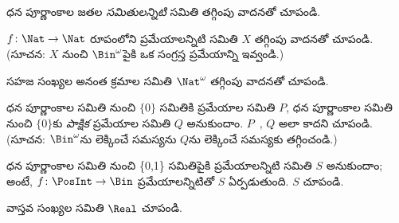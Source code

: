 \documentclass[../../../include/open-logic-section]{subfiles}
\begin{document}
\begin{prob}
ధన పూర్ణాంకాల జతల \emph{సమితులన్నిటి} సమితి 
తగ్గింపు వాదనతో చూపండి.
\end{prob}

\begin{prob}\label{sfr:siz:red:prob:nat-nat}
  $f\colon \Nat \to \Nat$ రూపంలోని ప్రమేయాలన్నిటి సమితి $X$
   తగ్గింపు వాదనతో చూపండి. (సూచన: $X$ నుంచి
  $\Bin^\omega$పైకి ఒక సంగ్రస్త ప్రమేయాన్ని ఇవ్వండి.)
\end{prob}

\begin{prob}
సహజ సంఖ్యల అనంత క్రమాల సమితి $\Nat^\omega$ 
తగ్గింపు వాదనతో చూపండి.
\end{prob}

\begin{prob}
ధన పూర్ణాంకాల సమితి నుంచి $\{0\}$ సమితికి ప్రమేయాల సమితి $P$,
ధన పూర్ణాంకాల సమితి నుంచి $\{0\}$కు \emph{పాక్షిక} ప్రమేయాల సమితి
$Q$ అనుకుందాం. $P$~, $Q$ అలా కాదని చూపండి. (సూచన:
$\Bin^\omega$ను లెక్కించే సమస్యను $Q$ను లెక్కించే సమస్యకు తగ్గించండి.)
\end{prob}

\begin{prob}
ధన పూర్ణాంకాల సమితి నుంచి \{0,1\} సమితిపైకి 
ప్రమేయాలన్నిటి సమితి $S$ అనుకుందాం; అంటే, 
$f\colon \PosInt \to \Bin$
ప్రమేయాలన్నిటితో $S$ ఏర్పడుతుంది. $S$  చూపండి.
\end{prob}

\begin{prob}
వాస్తవ సంఖ్యల సమితి $\Real$  చూపండి.
\end{prob}
\end{document}
